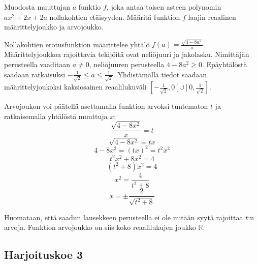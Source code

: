 \begin{tehtava}
	\begin{alakohdat}
	\end{alakohdat}
	\begin{vastaus}
		\begin{alakohdat}
	\end{alakohdat}
	\end{vastaus}
\end{tehtava}

\begin{tehtava}
Muodosta muuttujan $a$ funktio $f$, joka antaa toisen asteen polynomin $ax^2+2x+2a$ nollakohtien etäisyyden. Määritä funktion $f$ laajin reaalinen määrittelyjoukko ja arvojoukko.
	\begin{vastaus}
	Nollakohtien erotusfunktion määrittelee yhtälö $f(a)=\frac{\sqrt{4-8a^2}}{a}$. Määrittelyjoukkoa rajoittavia tekijöitä ovat neliöjuuri ja jakolasku. Nimittäjän perusteella vaaditaan $a\neq 0$, neliöjuuren perusteella $4-8a^2\geq 0$. Epäyhtälöstä saadaan ratkaisuksi $-\frac{1}{\sqrt{2}}\leq a \leq \frac{1}{\sqrt{2}}$. Yhdistämällä tiedot saadaan määrittelyjoukoksi kaksiosainen reaalilukuväli $[-\frac{1}{\sqrt{2}},0[\cup ]0,\frac{1}{\sqrt{2}}]$.
	
	Arvojoukon voi päätellä asettamalla funktion arvoksi tuntematon $t$ ja ratkaisemalla yhtälöstä muuttuja $x$:
	$$\frac{\sqrt{4-8x^2}}{x}=t$$
	$$\sqrt{4-8x^2}=tx$$
	$$4-8x^2=(tx)^2=t^2x^2$$
	$$t^2x^2+8x^2=4$$
	$$(t^2+8)x^2=4$$
	$$x^2=\frac{4}{t^2+8}$$
	$$x=\pm \frac{2}{\sqrt{t^2+8}}$$
	
	Huomataan, että saadun lausekkeen perusteella ei ole mitään syytä rajoittaa $t$:n arvoja. Funktion arvojoukko on siis koko reaalilukujen joukko $\mathbb{R}$.
	\end{vastaus}
\end{tehtava}

\subsection*{Harjoituskoe 3}

